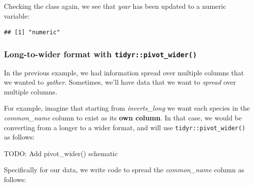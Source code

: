 \documentclass[]{book}
\newenvironment{Shaded}{\begin{snugshade}}{\end{snugshade}}
\newcommand{\CommentTok}[1]{\textcolor[rgb]{0.56,0.35,0.01}{\textit{#1}}}
\newcommand{\DataTypeTok}[1]{\textcolor[rgb]{0.13,0.29,0.53}{#1}}
\newcommand{\KeywordTok}[1]{\textcolor[rgb]{0.13,0.29,0.53}{\textbf{#1}}}
\newcommand{\NormalTok}[1]{#1}
\newcommand{\OperatorTok}[1]{\textcolor[rgb]{0.81,0.36,0.00}{\textbf{#1}}}
\newcommand{\StringTok}[1]{\textcolor[rgb]{0.31,0.60,0.02}{#1}}
\begin{document}
\begin{Shaded}
\end{Shaded}

Checking the class again, we see that \emph{year} has been updated to a numeric variable:

\begin{Shaded}
\end{Shaded}

\begin{verbatim}
## [1] "numeric"
\end{verbatim}

\hypertarget{long-to-wider-format-with-tidyrpivot_wider}{%
\subsubsection{\texorpdfstring{Long-to-wider format with \texttt{tidyr::pivot\_wider()}}{Long-to-wider format with tidyr::pivot\_wider()}}\label{long-to-wider-format-with-tidyrpivot_wider}}

In the previous example, we had information spread over multiple columns that we wanted to \emph{gather}. Sometimes, we'll have data that we want to \emph{spread} over multiple columns.

For example, imagine that starting from \emph{inverts\_long} we want each species in the \emph{common\_name} column to exist as its \textbf{own column}. In that case, we would be converting from a longer to a wider format, and will use \texttt{tidyr::pivot\_wider()} as follows:

TODO: Add pivot\_wider() schematic

Specifically for our data, we write code to spread the \emph{common\_name} column as follows:

\begin{Shaded}
\end{Shaded}
\end{document}
